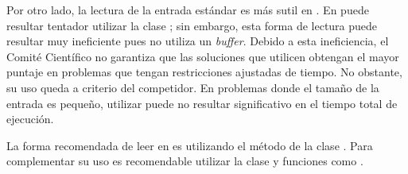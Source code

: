   Por otro lado, la lectura de la entrada estándar es más sutil en \java.
  En \java puede resultar tentador utilizar la clase ; sin embargo, esta forma de lectura puede resultar muy ineficiente pues no
  utiliza un \textit{buffer}.
  Debido a esta ineficiencia, el Comité Científico no garantiza que las
  soluciones que utilicen  obtengan el mayor puntaje en problemas
  que tengan restricciones ajustadas de tiempo.
  No obstante, su uso queda a criterio del competidor.
  En problemas donde el tamaño de la entrada es pequeño, utilizar 
  puede no resultar significativo en el tiempo total de ejecución.

  La forma recomendada de leer en \java es utilizando el método 
  de la clase .
  Para complementar su uso es recomendable utilizar la clase
   y funciones como .

